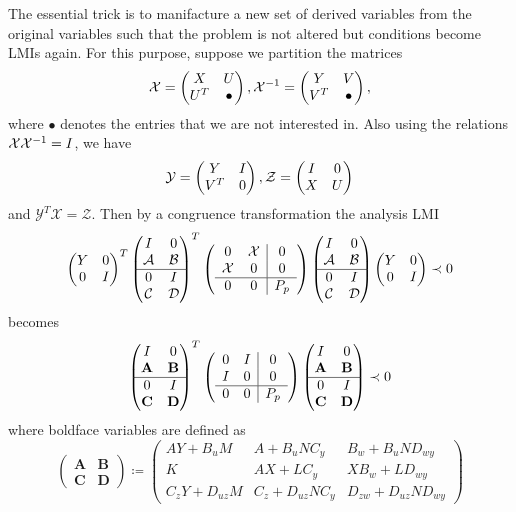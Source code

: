The essential trick is to manifacture a new set of derived variables from the original variables such that the problem is not altered but 
conditions become LMIs again. For this purpose, suppose we partition the matrices 
\[
\mathcal{X} = \begin{pmatrix}X &U\\U^T &\bullet\end{pmatrix}, \mathcal{X}^{-1} = \begin{pmatrix}Y &V\\V^T &\bullet\end{pmatrix}, 
\]
where $\bullet$ denotes the entries that we are not interested in. Also using the relations $\mathcal{X}\mathcal{X}^{-1}=I$, we have
\[
\mathcal{Y} = \begin{pmatrix}Y&I\\V^T&0\end{pmatrix}, \mathcal{Z} = \begin{pmatrix}I&0\\X&U\end{pmatrix}
\]
and $\mathcal{Y}^T\mathcal{X}= \mathcal{Z}$. Then by a congruence transformation the analysis LMI
\[
\begin{pmatrix}Y&0\\0&I\end{pmatrix}^T\begin{pmatrix}I&0\\\mathcal{A}&\mathcal{B}\\\hline 0&I\\\mathcal{C}&\mathcal{D}\end{pmatrix}^T
\left(
\begin{array}{cc|c}
	0&\mathcal{X}&0\\\mathcal{X}&0&0\\\hline 0&0&P_p
\end{array}
\right)
\begin{pmatrix}I&0\\\mathcal{A}&\mathcal{B}\\\hline 0&I\\\mathcal{C}&\mathcal{D}\end{pmatrix}\begin{pmatrix}Y&0\\0&I\end{pmatrix}\prec 0
\]
becomes
\begin{equation}
\begin{pmatrix}I&0\\\mathbf{A}&\mathbf{B}\\\hline 0&I\\\mathbf{C}&\mathbf{D}\end{pmatrix}^T
\left(
\begin{array}{cc|c}
	0&I&0\\I&0&0\\\hline 0&0&P_p
\end{array}
\right)
\begin{pmatrix}I&0\\\mathbf{A}&\mathbf{B}\\\hline 0&I\\\mathbf{C}&\mathbf{D}\end{pmatrix} \prec 0
\end{equation}
where boldface variables are defined as 
\[
\left(\begin{array}{c|c}
	\mathbf{A} &\mathbf{B}\\\hline\mathbf{C} &\mathbf{D}
\end{array}\right) \coloneqq \left(
\begin{array}{cc|c}
	AY+B_uM          &A+B_uNC_y     &B_w+B_uND_{wy}\\
	K                &AX+LC_y       &XB_w+LD_{wy}\\\hline
	C_zY+D_{uz}M     &C_z+D_{uz}NC_y &D_{zw}+D_{uz}ND_{wy}
\end{array}
\right)
\]
